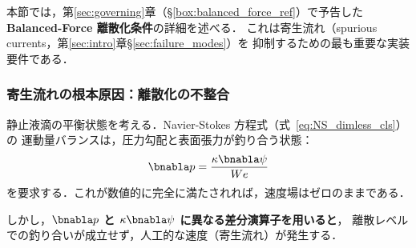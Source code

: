 本節では，第\ref{sec:governing}章（§\ref{box:balanced_force_ref}）で予告した
\textbf{Balanced-Force 離散化条件}の詳細を述べる．
これは寄生流れ（spurious currents，第\ref{sec:intro}章§\ref{sec:failure_modes}）を
抑制するための最も重要な実装要件である．

\subsubsection{寄生流れの根本原因：離散化の不整合}

静止液滴の平衡状態を考える．Navier-Stokes 方程式（式~\eqref{eq:NS_dimless_cls}）の
運動量バランスは，圧力勾配と表面張力が釣り合う状態：
\[
  \bnabla p = \frac{\kappa\bnabla\psi}{We}
\]
を要求する．これが数値的に完全に満たされれば，速度場はゼロのままである．

しかし，\textbf{$\bnabla p$ と $\kappa\bnabla\psi$ に異なる差分演算子を用いると}，
離散レベルでの釣り合いが成立せず，人工的な速度（寄生流れ）が発生する．

